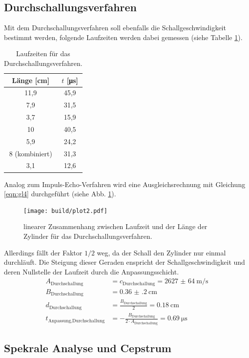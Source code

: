 \subsection{Durchschallungsverfahren}

Mit dem Durchschallungsverfahren soll ebenfalls die Schallgeschwindigkeit bestimmt werden, folgende Laufzeiten werden dabei gemessen (siehe Tabelle \ref{tab:Durch}).
\begin{table}
  \centering
  \caption{Laufzeiten für das Durchschallungsverfahren.}
  \label{tab:Durch}
  \begin{tabular}{c c}
    \toprule
    Länge [\si{\centi\meter}] & $t$ [\si{\micro\second}] \\
    \midrule
    11,9  & 45,9 \\
     7,9  & 31,5 \\
     3,7  & 15,9 \\
      10  & 40,5 \\
     5,9  & 24,2 \\
       8 (kombiniert) & 31,3 \\
     3,1  & 12,6 \\
    \bottomrule
  \end{tabular}
\end{table}
Analog zum Impuls-Echo-Verfahren wird eine Ausgleichsrechnung mit Gleichung \eqref{eqn:gl4} durchgeführt (siehe Abb. \ref{fig:plot2}).
\begin{figure}
  \texttt{[image: build/plot2.pdf]}
  \caption{linearer Zusammenhang zwischen Laufzeit und der Länge der Zylinder für das Durchschallungsverfahren.}
  \label{fig:plot2}
\end{figure}
Allerdings fällt der Faktor $1/2$ weg, da der Schall den Zylinder nur einmal durchläuft.
Die Steigung dieser Geraden enspricht der Schallgeschwindigkeit und deren Nullstelle der Laufzeit durch die Anpassungsschicht.
\begin{align*}
  A_\text{Durchschallung} &= c_\text{Durchschallung} = \SI{2627(64)}{\meter\per\second} \\
  B_\text{Durchschallung} &= \SI{0.36(20)}{\centi\meter} \\
  d_\text{Durchschallung} &= \frac{B_\text{Durchschallung}}{2} = \SI{0.18}{\centi\meter} \\
  t_\text{Anpassung,Durchschallung} &= - \frac{B_\text{Durchschallung}}{2 \cdot A_\text{Durchschallung}} =\SI{0.69}{\micro\second}
\end{align*}
\FloatBarrier

\subsection{Spekrale Analyse und Cepstrum}
\label{sec:cep}

